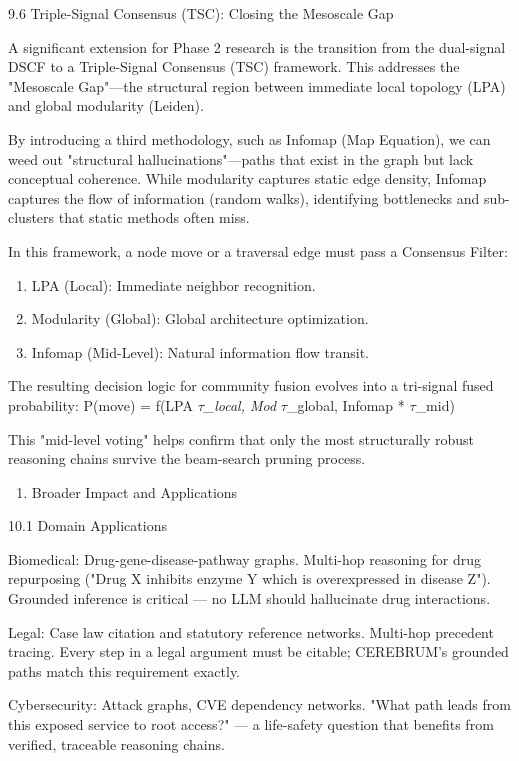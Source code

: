 \documentclass[10pt,journal,compsoc]{IEEEtran}
\begin{document}
9.6 Triple-Signal Consensus (TSC): Closing the Mesoscale Gap

A significant extension for Phase 2 research is the transition from the dual-signal DSCF to a Triple-Signal Consensus (TSC) framework. This addresses the "Mesoscale Gap"—the structural region between immediate local topology (LPA) and global modularity (Leiden).

By introducing a third methodology, such as Infomap (Map Equation), we can weed out "structural hallu\-cinations"—paths that exist in the graph but lack conceptual coherence. While modularity captures static edge density, Infomap captures the flow of information (random walks), identifying bottlenecks and sub-clusters that static methods often miss.

In this framework, a node move or a traversal edge must pass a Consensus Filter:
\begin{enumerate}
\item LPA (Local): Immediate neighbor recognition.
\item Modularity (Global): Global archi\-tecture optim\-ization.
\item Infomap (Mid-Level): Natural information flow transit.

\end{enumerate}
The resulting decision logic for community fusion evolves into a tri-signal fused probability:
P(move) = f(LPA \textit{ $\tau$\_local, Mod } $\tau$\_global, Infomap * $\tau$\_mid)

This "mid-level voting" helps confirm that only the most struc\-turally robust reasoning chains survive the beam-search pruning process.

\begin{enumerate}
\item Broader Impact and Applic\-ations

\end{enumerate}
10.1 Domain Applic\-ations

Biomedical: Drug-gene-disease-pathway graphs. Multi-hop reasoning for drug repurposing ("Drug X inhibits enzyme Y which is overe\-xpressed in disease Z").
Grounded inference is critical — no LLM should hallucinate drug inter\-actions.

Legal: Case law citation and statutory reference networks. Multi-hop precedent tracing. Every step in a legal argument must be citable; CEREBRUM's grounded paths match this requirement exactly.

Cybers\-ecurity: Attack graphs, CVE dependency networks. "What path leads from this exposed service to root access?" — a life-safety question that benefits from verified, traceable reasoning chains.
\end{document}
